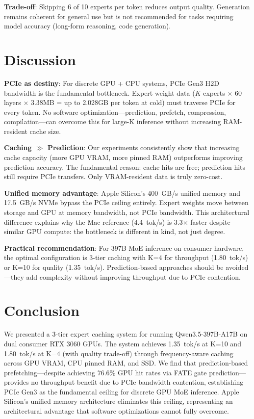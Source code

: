 \documentclass[conference]{IEEEtran}
\begin{document}
\textbf{Trade-off}: Skipping 6 of 10 experts per token reduces output quality. Generation remains coherent for general use but is not recommended for tasks requiring model accuracy (long-form reasoning, code generation).

\section{Discussion}

\textbf{PCIe as destiny}: For discrete GPU + CPU systems, PCIe Gen3 H2D bandwidth is the fundamental bottleneck. Expert weight data ($K$ experts $\times$ 60 layers $\times$ 3.38MB = up to 2.028GB per token at cold) must traverse PCIe for every token. No software optimization---prediction, prefetch, compression, compilation---can overcome this for large-K inference without increasing RAM-resident cache size.

\textbf{Caching $\gg$ Prediction}: Our experiments consistently show that increasing cache capacity (more GPU VRAM, more pinned RAM) outperforms improving prediction accuracy. The fundamental reason: cache hits are free; prediction hits still require PCIe transfers. Only VRAM-resident data is truly zero-cost.

\textbf{Unified memory advantage}: Apple Silicon's 400~GB/s unified memory and 17.5~GB/s NVMe bypass the PCIe ceiling entirely. Expert weights move between storage and GPU at memory bandwidth, not PCIe bandwidth. This architectural difference explains why the Mac reference (4.4~tok/s) is 3.3$\times$ faster despite similar GPU compute: the bottleneck is different in kind, not just degree.

\textbf{Practical recommendation}: For 397B MoE inference on consumer hardware, the optimal configuration is 3-tier caching with K=4 for throughput (1.80~tok/s) or K=10 for quality (1.35~tok/s). Prediction-based approaches should be avoided---they add complexity without improving throughput due to PCIe contention.

\section{Conclusion}

We presented a 3-tier expert caching system for running Qwen3.5-397B-A17B on dual consumer RTX 3060 GPUs. The system achieves 1.35~tok/s at K=10 and 1.80~tok/s at K=4 (with quality trade-off) through frequency-aware caching across GPU VRAM, CPU pinned RAM, and SSD. We find that prediction-based prefetching---despite achieving 76.6\% GPU hit rates via FATE gate prediction---provides no throughput benefit due to PCIe bandwidth contention, establishing PCIe Gen3 as the fundamental ceiling for discrete GPU MoE inference. Apple Silicon's unified memory architecture eliminates this ceiling, representing an architectural advantage that software optimizations cannot fully overcome.



\end{document}
